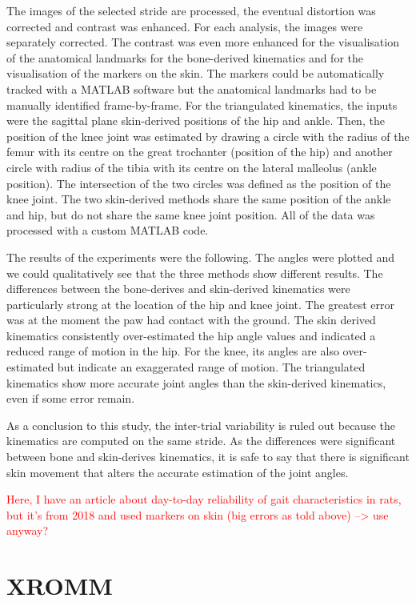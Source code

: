 The images of the selected stride are processed, the eventual distortion was corrected and contrast was enhanced. For each analysis, the images were separately corrected. The contrast was even more enhanced for the visualisation of the anatomical landmarks for the bone-derived kinematics and for the visualisation of the markers on the skin. The markers could be automatically tracked with a MATLAB\textsuperscript{\textregistered} software but the anatomical landmarks had to be manually identified frame-by-frame. For the triangulated kinematics, the inputs were the sagittal plane skin-derived positions of the hip and ankle. Then, the position of the knee joint was estimated by drawing a circle with the radius of the femur with its centre on the great trochanter (position of the hip) and another circle with radius of the tibia with its centre on the lateral malleolus (ankle position). The intersection of the two circles was defined as the position of the knee joint. The two skin-derived methods share the same position of the ankle and hip, but do not share the same knee joint position. All of the data was processed with a custom MATLAB\textsuperscript{\textregistered} code.

The results of the experiments were the following. The angles were plotted and we could qualitatively see that the three methods show different results. The differences between the bone-derives and skin-derived kinematics were particularly strong at the location of the hip and knee joint. The greatest error was at the moment the paw had contact with the ground. The skin derived kinematics consistently over-estimated the hip angle values and indicated a reduced range of motion in the hip. For the knee, its angles are also over-estimated but indicate an exaggerated range of motion. The triangulated kinematics show more accurate joint angles than the skin-derived kinematics, even if some error remain.

As a conclusion to this study, the inter-trial variability is ruled out because the kinematics are computed on the same stride. As the differences were significant between bone and skin-derives kinematics, it is safe to say that there is significant skin movement that alters the accurate estimation of the joint angles. 

\textcolor{red}{Here, I have an article about day-to-day reliability of gait characteristics in rats, but it's from 2018 and used markers on skin (big errors as told above) --> use anyway?}

\section{XROMM}